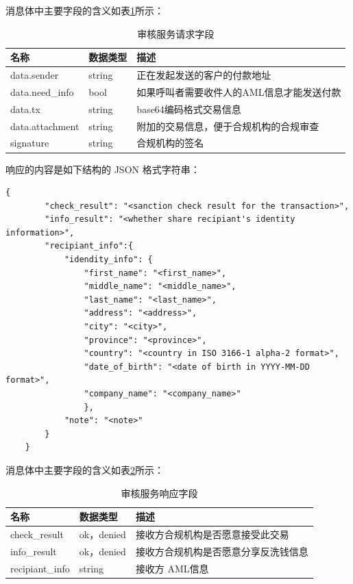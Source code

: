 消息体中主要字段的含义如表\ref{tab:auth_req_field}所示：

\begin{table}[h]
    \caption{审核服务请求字段} 
    \label{tab:auth_req_field}
    \small %
    \centering %
    \begin{tabular}{lll} %
        \toprule[\heavyrulewidth]\toprule[\heavyrulewidth]
        \textbf{名称} & \textbf{数据类型} & \textbf{描述} \\ 
        \midrule
        data.sender & string & 正在发起发送的客户的付款地址 \\
        data.need\_info & bool & 如果呼叫者需要收件人的AML信息才能发送付款 \\
        data.tx & string & base64编码格式交易信息 \\
        data.attachment & string & 附加的交易信息，便于合规机构的合规审查 \\
        signature & string & 合规机构的签名 \\
        \bottomrule[\heavyrulewidth] 
    \end{tabular}
\end{table}

响应的内容是如下结构的 JSON 格式字符串：

\begin{lstlisting}[caption={审核服务响应}, label={lst:auth_reply}]
    {
        "check_result": "<sanction check result for the transaction>",
        "info_result": "<whether share recipiant's identity information>",
        "recipiant_info":{
            "idendity_info": {
                "first_name": "<first_name>",
                "middle_name": "<middle_name>",
                "last_name": "<last_name>",
                "address": "<address>",
                "city": "<city>",
                "province": "<province>",
                "country": "<country in ISO 3166-1 alpha-2 format>",
                "date_of_birth": "<date of birth in YYYY-MM-DD format>",
                "company_name": "<company_name>"
                },
            "note": "<note>"
        }
    }
\end{lstlisting}

消息体中主要字段的含义如表\ref{tab:auth_reply_field}所示：

\begin{table}[h]
    \caption{审核服务响应字段} 
    \label{tab:auth_reply_field}
    \small %
    \centering %
    \begin{tabular}{lll} %
        \toprule[\heavyrulewidth]\toprule[\heavyrulewidth]
        \textbf{名称} & \textbf{数据类型} & \textbf{描述} \\ 
        \midrule
        check\_result & ok，denied & 接收方合规机构是否愿意接受此交易 \\
        info\_result & ok，denied & 接收方合规机构是否愿意分享反洗钱信息 \\
        recipiant\_info & string &  接收方 AML信息 \\
        \bottomrule[\heavyrulewidth] 
    \end{tabular}
\end{table}

